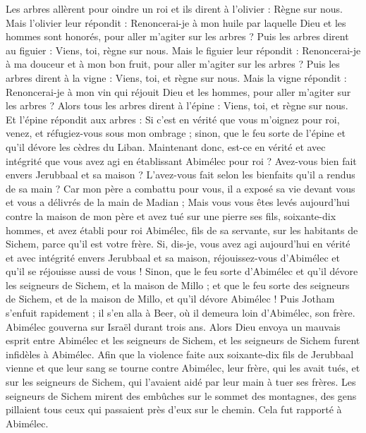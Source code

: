 \begin{multicols}{2}
Les arbres allèrent pour oindre un roi et ils dirent à l'olivier : Règne sur nous.
Mais l'olivier leur répondit : Renoncerai-je à mon huile par laquelle Dieu et les hommes sont honorés, pour aller m'agiter sur les arbres ?
Puis les arbres dirent au figuier : Viens, toi, règne sur nous.
Mais le figuier leur répondit : Renoncerai-je à ma douceur et à mon bon fruit, pour aller m'agiter sur les arbres ?
Puis les arbres dirent à la vigne : Viens, toi, et règne sur nous.
Mais la vigne répondit : Renoncerai-je à mon vin qui réjouit Dieu et les hommes, pour aller m'agiter sur les arbres ?
Alors tous les arbres dirent à l'épine : Viens, toi, et règne sur nous.
Et l'épine répondit aux arbres : Si c'est en vérité que vous m'oignez pour roi, venez, et réfugiez-vous sous mon ombrage ; sinon, que le feu sorte de l'épine et qu'il dévore les cèdres du Liban.
Maintenant donc, est-ce en vérité et avec intégrité que vous avez agi en établissant Abimélec pour roi ? Avez-vous bien fait envers Jerubbaal et sa maison ? L'avez-vous fait selon les bienfaits qu'il a rendus de sa main ?
Car mon père a combattu pour vous, il a exposé sa vie devant vous et vous a délivrés de la main de Madian ;
Mais vous vous êtes levés aujourd'hui contre la maison de mon père et avez tué sur une pierre ses fils, soixante-dix hommes, et avez établi pour roi Abimélec, fils de sa servante, sur les habitants de Sichem, parce qu'il est votre frère.
Si, dis-je, vous avez agi aujourd'hui en vérité et avec intégrité envers Jerubbaal et sa maison, réjouissez-vous d'Abimélec et qu'il se réjouisse aussi de vous !
Sinon, que le feu sorte d'Abimélec et qu'il dévore les seigneurs de Sichem, et la maison de Millo ; et que le feu sorte des seigneurs de Sichem, et de la maison de Millo, et qu'il dévore Abimélec !
Puis Jotham s'enfuit rapidement ; il s'en alla à Beer, où il demeura loin d'Abimélec, son frère.
Abimélec gouverna sur Israël durant trois ans.
Alors Dieu envoya un mauvais esprit entre Abimélec et les seigneurs de Sichem, et les seigneurs de Sichem furent infidèles à Abimélec.
Afin que la violence faite aux soixante-dix fils de Jerubbaal vienne et que leur sang se tourne contre Abimélec, leur frère, qui les avait tués, et sur les seigneurs de Sichem, qui l'avaient aidé par leur main à tuer ses frères.
Les seigneurs de Sichem mirent des embûches sur le sommet des montagnes, des gens pillaient tous ceux qui passaient près d'eux sur le chemin. Cela fut rapporté à Abimélec.

\end{multicols}
